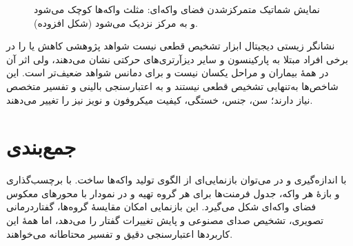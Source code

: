 \begin{figure}[htbp]
\centering
{}
\caption{نمایش شماتیک متمرکزشدن فضای واکه‌ای: مثلث واکه‌ها کوچک می‌شود و به مرکز نزدیک می‌شود (شکل افزوده).}
\end{figure}

\begin{correctionbox}{نشانگر زیستی دیجیتال ابزار تشخیص قطعی نیست}
شواهد پژوهشی کاهش  یا  را در برخی افراد مبتلا به پارکینسون و سایر دیزآرتری‌های حرکتی نشان می‌دهند، ولی اثر آن در همهٔ بیماران و مراحل یکسان نیست و برای دمانس شواهد ضعیف‌تر است. این شاخص‌ها به‌تنهایی تشخیص قطعی نیستند و به اعتبارسنجی بالینی و تفسیر متخصص نیاز دارند؛ سن، جنس، خستگی، کیفیت میکروفون و نویز نیز  را تغییر می‌دهند.
\end{correctionbox}

\section{جمع‌بندی}
با اندازه‌گیری  و  در  می‌توان بازنمایی‌ای از الگوی تولید واکه‌ها ساخت. با برچسب‌گذاری  و بازهٔ هر واکه، جدول فرمنت‌ها برای هر گروه تهیه و در نمودار  با محورهای معکوس فضای واکه‌ای شکل می‌گیرد. این بازنمایی امکان مقایسهٔ گروه‌ها، گفتاردرمانی تصویری، تشخیص صدای مصنوعی و پایش تغییرات گفتار را می‌دهد، اما همهٔ این کاربردها اعتبارسنجی دقیق و تفسیر محتاطانه می‌خواهند.

